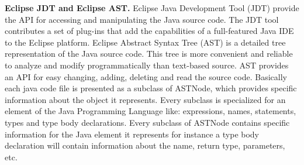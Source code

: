\textbf{Eclipse JDT and Eclipse AST.} Eclipse Java Development Tool (JDT) \cite{jdt} provide the API for accessing and manipulating the Java source code. The JDT tool contributes a set of plug-ins that add the capabilities of a full-featured Java IDE to the Eclipse platform. Eclipse Abstract Syntax Tree (AST) \cite{ast} is a detailed tree representation of the Java source code. This tree is more convenient and reliable to analyze and modify programmatically than text-based source. AST provides an API for easy changing, adding, deleting and read the source code. Basically each java code file is presented as a subclass of ASTNode, which provides specific information about the object it represents. Every subclass is specialized for an element of the Java Programming Language like: expressions, names, statements, types and type body declarations. Every subclass of ASTNode contains specific information for the Java element it represents for instance a type body declaration will contain information about the name, return type, parameters, etc.

